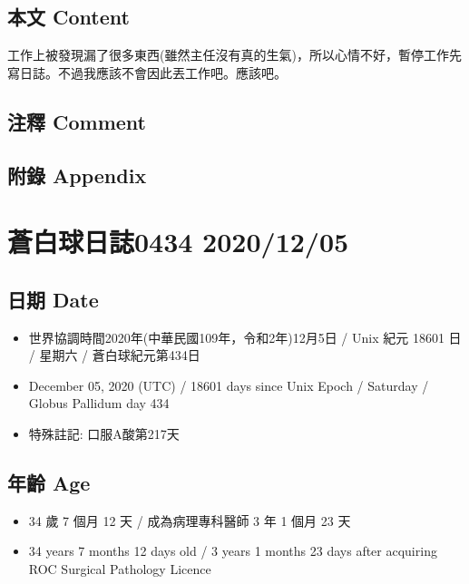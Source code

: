 \documentclass[a5paper, 11pt
]{book}
\providecommand{\tightlist}{%
  \setlength{\itemsep}{0pt}\setlength{\parskip}{0pt}}
\begin{document}
\hypertarget{ux672cux6587-content-3}{%
\subsection{本文 Content}\label{ux672cux6587-content-3}}

工作上被發現漏了很多東西(雖然主任沒有真的生氣)，所以心情不好，暫停工作先寫日誌。不過我應該不會因此丟工作吧。應該吧。

\hypertarget{ux6ce8ux91cb-comment-3}{%
\subsection{注釋 Comment}\label{ux6ce8ux91cb-comment-3}}

\hypertarget{ux9644ux9304-appendix-3}{%
\subsection{附錄 Appendix}\label{ux9644ux9304-appendix-3}}

\hypertarget{ux84bcux767dux7403ux65e5ux8a8c0434-20201205}{%
\section{蒼白球日誌0434
2020/12/05}\label{ux84bcux767dux7403ux65e5ux8a8c0434-20201205}}

\hypertarget{ux65e5ux671f-date-4}{%
\subsection{日期 Date}\label{ux65e5ux671f-date-4}}

\begin{itemize}
\tightlist
\item
  世界協調時間2020年(中華民國109年，令和2年)12月5日 / Unix 紀元 18601 日
  / 星期六 / 蒼白球紀元第434日
\item
  December 05, 2020 (UTC) / 18601 days since Unix Epoch / Saturday /
  Globus Pallidum day 434
\item
  特殊註記: 口服A酸第217天
\end{itemize}

\hypertarget{ux5e74ux9f61-age-4}{%
\subsection{年齡 Age}\label{ux5e74ux9f61-age-4}}

\begin{itemize}
\tightlist
\item
  34 歲 7 個月 12 天 / 成為病理專科醫師 3 年 1 個月 23 天
\item
  34 years 7 months 12 days old / 3 years 1 months 23 days after
  acquiring ROC Surgical Pathology Licence
\end{itemize}
\end{document}
